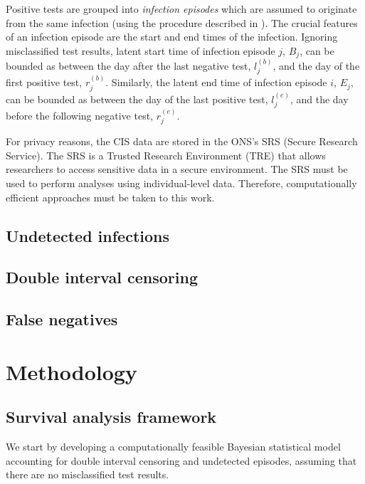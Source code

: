 \documentclass[12pt]{article}
\begin{document}
Positive tests are grouped into \emph{infection episodes} which are assumed to originate from the same infection (using the procedure described in \citep{weiRisk}).
The crucial features of an infection episode are the start and end times of the infection.
Ignoring misclassified test results, latent start time of infection episode $j$, $B_j$, can be bounded as between the day after the last negative test, $l_j^{(b)}$, and the day of the first positive test, $r_j^{(b)}$.
Similarly, the latent end time of infection episode $i$, $E_j$, can be bounded as between the day of the last positive test, $l_j^{(e)}$, and the day before the following negative test, $r_j^{(e)}$.


For privacy reasons, the CIS data are stored in the ONS's SRS (Secure Research Service).
The SRS is a Trusted Research Environment (TRE) that allows researchers to access sensitive data in a secure environment.
The SRS must be used to perform analyses using individual-level data.
Therefore, computationally efficient approaches must be taken to this work.

\subsection{Undetected infections}

\subsection{Double interval censoring} \label{perf-test:sec:interval-censoring}

\subsection{False negatives}

\section{Methodology}

\subsection{Survival analysis framework}

We start by developing a computationally feasible Bayesian statistical model accounting for double interval censoring and undetected episodes, assuming that there are no misclassified test results.
\end{document}

